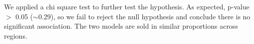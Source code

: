 \begin{table}[H]
    \centering
    \caption{Conditional probabilities: P(Model $\vert$ SalesRegion)}
    \label{tab:q16}
\end{table}

We applied a chi square test to further test the hypothesis. As expected, p-value $>$ 0.05 ($\sim$0.29), so we fail to reject the null hypothesis and conclude there is no significant association. The two models are sold in similar proportions across regions.